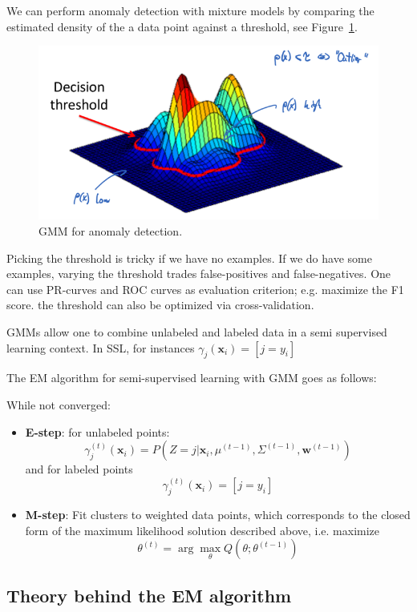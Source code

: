 \documentclass[a4paper,10pt,twoside]{article}
\begin{document}
We can perform anomaly detection with mixture models by comparing the estimated density of the a data point against a threshold, see Figure~\ref{fig:gmm_anomaly_detection}.

\begin{figure}
  \centering
  \includegraphics[width=.5\textwidth]{figures/anomaly_detection_with_mixture_models.png}
  \caption{GMM for anomaly detection.}
  \label{fig:gmm_anomaly_detection}
\end{figure}

Picking the threshold is tricky if we have no examples. If we do have some examples, varying the threshold trades false-positives and false-negatives. One can use PR-curves and ROC curves as evaluation criterion; e.g. maximize the F1 score. the threshold can also be optimized via cross-validation.

GMMs allow one to combine unlabeled and labeled data in a semi supervised learning context. In SSL, for instances $\gamma_j(\mathbf{x}_i)=[j=y_i]$

The EM algorithm for semi-supervised learning with GMM goes as follows:

While not converged:
\begin{itemize}
\item \textbf{E-step}: for unlabeled points:
  \begin{equation*}
    \gamma_j^{(t)}(\mathbf{x}_i)=P(Z=j|\mathbf{x}_i,\mu^{(t-1)},\Sigma^{(t-1)},\mathbf{w}^{(t-1)})
  \end{equation*}
  and for labeled points
  \begin{equation*}
    \gamma_j^{(t)}(\mathbf{x}_i)=[j=y_i]
  \end{equation*}
  \item\textbf{M-step}: Fit clusters to weighted data points, which corresponds to the closed form of the maximum likelihood solution described above, i.e. maximize
  \begin{equation*}
    \theta^{(t)}=\arg\max_{\theta}Q(\theta;\theta^{(t-1)})
  \end{equation*}
\end{itemize}

\subsection{Theory behind the EM algorithm}
\end{document}
